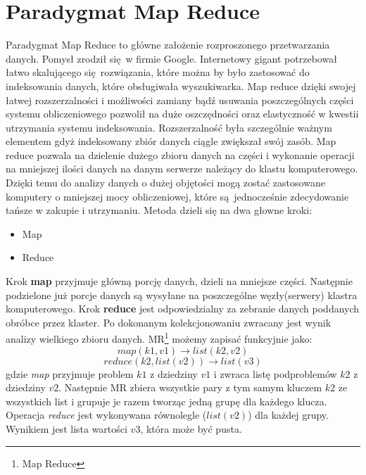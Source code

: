 \section{Paradygmat Map Reduce}
Paradygmat Map Reduce to główne założenie rozproszonego przetwarzania danych. Pomysł zrodził się w firmie Google. Internetowy gigant potrzebował łatwo skalującego się rozwiązania, które można by było zastosować do indeksowania danych, które obsługiwała wyszukiwarka. Map reduce dzięki swojej łatwej rozszerzalności i możliwości zamiany bądź usuwania poszczególnych części systemu obliczeniowego pozwolił na duże oszczędności oraz elastyczność w kwestii utrzymania systemu indeksowania. Rozszerzalność była szczególnie ważnym elementem gdyż indeksowany zbiór danych ciągle zwiększał swój zasób.
\newline
Map reduce pozwala na dzielenie dużego zbioru danych na części i wykonanie operacji na mniejszej ilości danych na danym serwerze należący do klastu komputerowego. Dzięki temu do analizy danych o dużej objętości mogą zostać zastosowane komputery o mniejszej mocy obliczeniowej, które są jednocześnie zdecydowanie tańsze w zakupie i utrzymaniu. Metoda dzieli się na dwa głowne kroki:
\begin{itemize}
	\item Map
	\item Reduce 
\end{itemize}
Krok \textbf{map} przyjmuje główną porcję danych, dzieli na mniejsze części. Następnie podzielone już porcje danych są wysyłane na poszczególne węzły(serwery) klastra komputerowego. Krok \textbf{reduce} jest odpowiedzialny za zebranie danych poddanych obróbce przez klaster. Po dokonanym kolekcjonowaniu zwracany jest wynik analizy wielkiego zbioru danych.\cite{map_reduce_description}
\newline MR\footnote{Map Reduce} możemy zapisać funkcyjnie jako:
\begin{equation}
map(k1,v1) \to list(k2,v2)
\end{equation}
\begin{equation}
reduce(k2, list (v2)) \to list (v3)
\end{equation}
gdzie \textit{map} przyjmuje problem $k1$ z dziedziny $v1$ i zwraca listę podproblemów $k2$ z dziedziny $v2$. Następnie MR zbiera wszystkie pary z tym samym kluczem $k2$ ze wszystkich list i grupuje je razem tworząc jedną grupę dla każdego klucza. Operacja \textit{reduce} jest wykonywana równolegle ($list(v2)$) dla każdej grupy. Wynikiem jest lista wartości $v3$, która może być pusta.\cite{map_reduce_microsoft_article}
